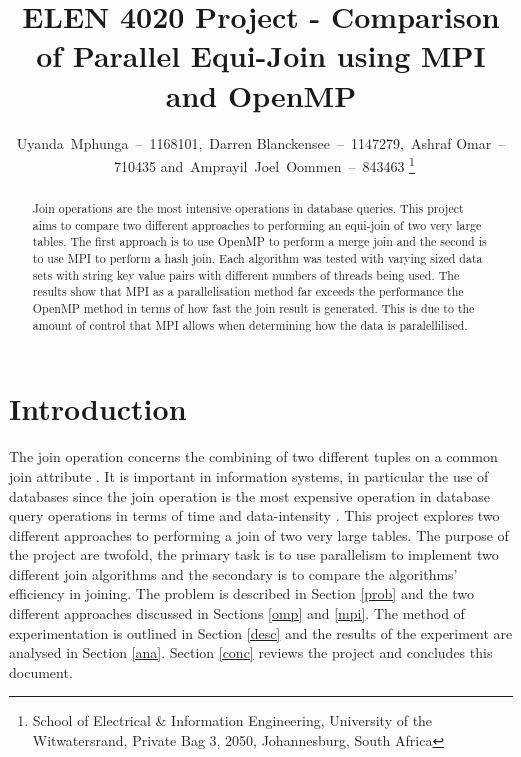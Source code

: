 \documentclass[journal,draftclsnofoot,11pt]{IEEEtran}
\begin{document}
\title{ELEN 4020 Project - Comparison of Parallel Equi-Join using MPI and OpenMP}
\author{Uyanda~Mphunga~--~1168101,~Darren Blanckensee~--~1147279,~Ashraf Omar~--~710435 and~Amprayil~Joel~Oommen~--~843463
\thanks{School of Electrical \& Information Engineering, University of the
Witwatersrand, Private Bag 3, 2050, Johannesburg, South Africa}
}
\maketitle
\pagestyle{plain}
\begin{abstract}
Join operations are the most intensive operations in database queries. This project aims to compare two different approaches to performing an equi-join of two very large tables. The first approach is to use OpenMP to perform a merge join and the second is to use MPI to perform a hash join. Each algorithm was tested with varying sized data sets with string key value pairs with different numbers of threads being used. The results show that MPI as a parallelisation method far exceeds the performance the OpenMP method in terms of how fast the join result is generated. This is due to the amount of control that MPI allows when determining how the data is paralellilised.
\end{abstract}
\section{Introduction}
The join operation concerns the combining of two different tuples on a common join attribute \cite{Yu1998}. It is important in information systems, in particular the use of databases since the join operation is the most expensive operation in database query operations in terms of time and data-intensity \cite{Mishra1992}. This project explores two different approaches to performing a join of two very large tables. The purpose of the project are twofold, the primary task is to use parallelism to implement two different join algorithms and the secondary is to compare the algorithms’ efficiency in joining. The problem is described in Section \ref{prob} and the two different approaches discussed in Sections \ref{omp} and \ref{mpi}. The method of experimentation is outlined in Section \ref{desc} and the results of the experiment are analysed in Section \ref{ana}. Section \ref{conc} reviews the project and concludes this document.
\end{document}
